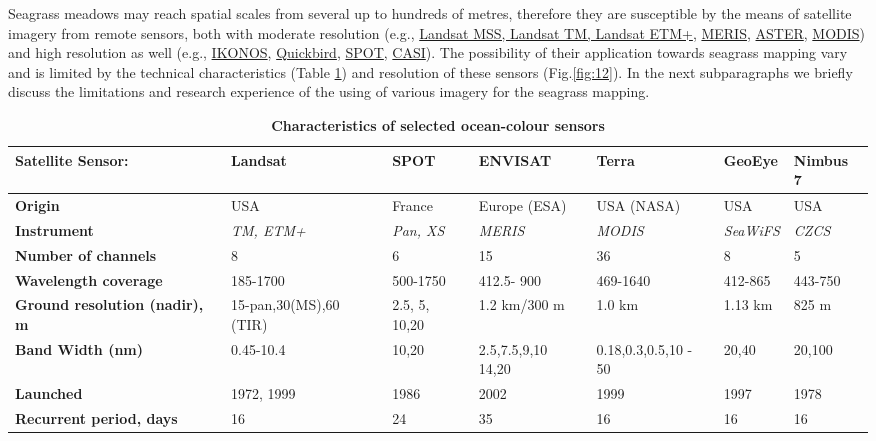 \documentclass[10pt, a4paper]{article}
\begin{document}
Seagrass meadows may reach spatial scales from several up to hundreds of metres, therefore they are
susceptible by the means of satellite imagery from remote sensors, both with moderate resolution
(e.g., \href{http://landsat.gsfc.nasa.gov/}{Landsat MSS, Landsat TM, Landsat ETM+}, \href{http://envisat.esa.int/instruments/meris/}{MERIS}, \href{http://asterweb.jpl.nasa.gov/}{ASTER}, \href{http://modis.gsfc.nasa.gov/}{MODIS}) and high resolution as
well (e.g., \href{http://www.satimagingcorp.com/gallery-ikonos.html}{IKONOS}, \href{http://www.digitalglobe.com/index.php/85/QuickBird}{Quickbird}, \href{http://www.spotimage.fr/}{SPOT}, \href{http://www.itres.com/products/imagers/casi550}{CASI}). The possibility of their application towards seagrass mapping
vary and is limited by the technical characteristics (Table \ref{tab:1}) and resolution of these sensors  (Fig.\ref{fig:12}). In the next subparagraphs
we briefly discuss the limitations and research experience of the using of various imagery
for the seagrass mapping.

\begin{table}[htbp]
\caption{\textbf{Characteristics of selected ocean-colour sensors}}
\begin{center}
\begin{tabular}{|p{2cm}|p{20mm}|p{15mm}|p{17mm}|p{15mm}|p{15mm}|p{15mm}|}
\hline\hline
\textbf{Satellite Sensor:} & {\textbf{Landsat}} & {\textbf{SPOT}} & {\textbf{ENVISAT}} & {\textbf{Terra}} & {\textbf{GeoEye}} & {\textbf{Nimbus 7}} \\ \hline\hline
	\textbf{Origin} & USA & France & Europe (ESA) & USA (NASA) & USA & USA \\ \hline
	\textbf{Instrument} & \textit{TM, ETM+} & \textit{Pan, XS} & \textit{MERIS} & \textit{MODIS} & \textit{SeaWiFS} & \textit{CZCS}\\ \hline
	\textbf{Number of channels} & 8 & 6 & 15 & 36 & 8 & 5 \\ \hline
	\textbf{Wavelength coverage} & 185-1700 & 500-1750 & 412.5- 900 & 469-1640 & 412-865 & 443-750 \\ \hline
	\textbf{Ground resolution (nadir), m} & 15-pan,30(MS),60 (TIR) & 2.5, 5, 10,20 & 1.2 km/300 m & 1.0 km & 1.13 km & 825 m \\ \hline
	\textbf{Band Width (nm)} & 0.45-10.4 & 10,20 & 2.5,7.5,9,10 14,20 & 0.18,0.3,0.5,10 - 50 & 20,40 & 20,100 \\ \hline
	\textbf{Launched} & 1972, 1999 & 1986 & 2002 & 1999 & 1997 & 1978 \\ \hline
	\textbf{Recurrent period, days} & 16 & 24 & 35 & 16 & 16 & 16 \\ \hline
\end{tabular}
\end{center}
\label{tab:1}
\end{table}
\end{document}
